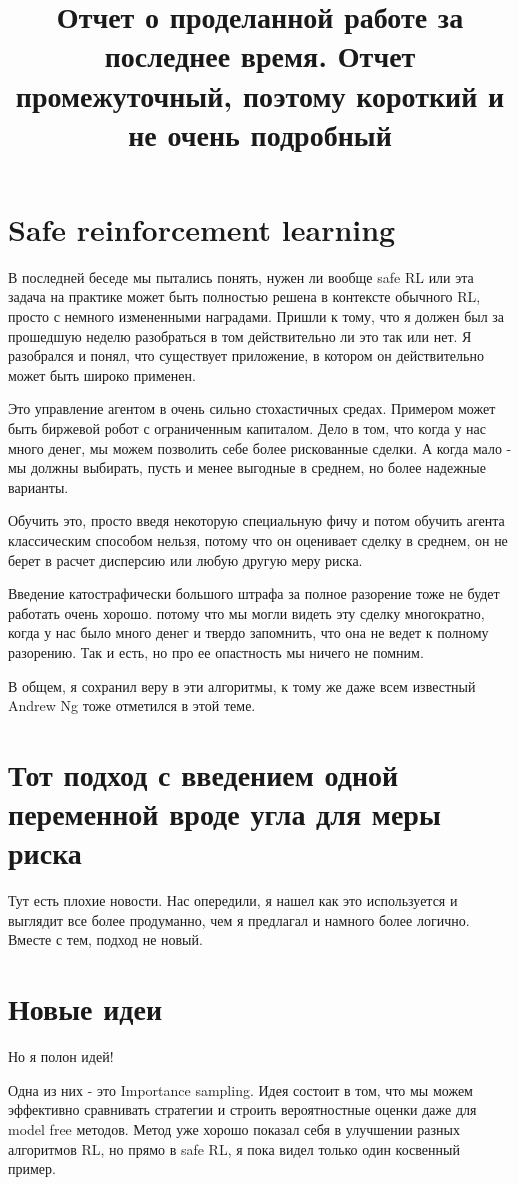 \documentclass[a4paper]{article}
\begin{document}
\title{Отчет о проделанной работе за последнее время. Отчет промежуточный, поэтому короткий и не очень подробный}

\maketitle 
\section{Safe reinforcement learning}
В последней беседе мы пытались понять, нужен ли вообще safe RL или эта задача на практике может быть полностью решена в контексте обычного RL, просто с немного измененными наградами. 
Пришли к тому, что я должен был за прошедшую неделю разобраться в том действительно ли это так или нет.
Я разобрался и понял, что существует приложение, в котором он действительно может быть широко применен.

Это управление агентом в очень сильно стохастичных средах. Примером может быть биржевой робот с ограниченным капиталом. Дело в том, что когда у нас много денег, мы можем позволить себе более рискованные сделки. А когда мало - мы должны выбирать, пусть и менее выгодные в среднем, но более надежные варианты. 

Обучить это, просто введя некоторую специальную фичу и потом обучить агента классическим способом нельзя, потому что он оценивает сделку в среднем, он не берет в расчет дисперсию или любую другую меру риска. 

Введение катострафически большого штрафа за полное разорение тоже не будет работать очень хорошо. потому что мы могли видеть эту сделку многократно, когда у нас было много денег и твердо запомнить, что она не ведет к полному разорению. Так и есть, но про ее опастность мы ничего не помним.


В общем, я сохранил веру в эти алгоритмы, к тому же даже всем известный Andrew Ng тоже отметился в этой теме.

\section{Тот подход с введением одной переменной вроде угла для меры риска}
Тут есть плохие новости. Нас опередили, я нашел как это используется и выглядит все более продуманно, чем я предлагал и намного более логично. Вместе с тем, подход не новый.


\section{Новые идеи}
Но я полон идей!

Одна из них - это Importance sampling. Идея состоит в том, что мы можем эффективно сравнивать стратегии и строить вероятностные оценки даже для model free методов. Метод уже хорошо показал себя в улучшении разных алгоритмов RL, но прямо в safe RL, я пока видел только один косвенный пример.
\end{document}
